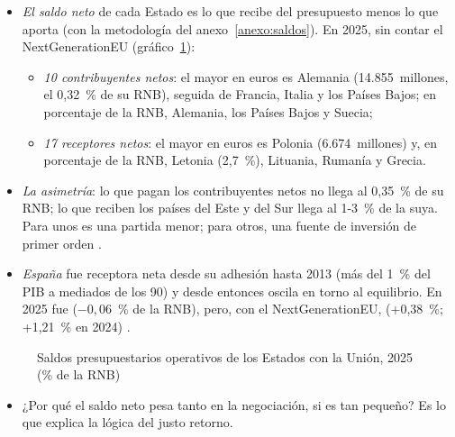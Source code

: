 \documentclass[11pt]{article}
\begin{document}
\begin{itemize}
\item \emph{El saldo neto} de cada Estado es lo que recibe del presupuesto menos lo que aporta (con la metodología del anexo~\ref{anexo:saldos}). En 2025, sin contar el NextGenerationEU (gráfico~\ref{fig:saldos})\nocite{CE2026GastosIngresos}:
  \begin{itemize}
  \item \emph{10 contribuyentes netos}: el mayor en euros es Alemania (14.855~millones, el 0,32~\% de su RNB), seguida de Francia, Italia y los Países Bajos; en porcentaje de la RNB, Alemania, los Países Bajos y Suecia;
  \item \emph{17 receptores netos}: el mayor en euros es Polonia (6.674~millones) y, en porcentaje de la RNB, Letonia (2,7~\%), Lituania, Rumanía y Grecia.
  \end{itemize}
\item \emph{La asimetría}: lo que pagan los contribuyentes netos no llega al 0,35~\% de su RNB; lo que reciben los países del Este y del Sur llega al 1-3~\% de la suya. Para unos es una partida menor; para otros, una fuente de inversión de primer orden .
\item \emph{España} fue receptora neta desde su adhesión hasta 2013 (más del 1~\% del PIB a mediados de los 90) y desde entonces oscila en torno al equilibrio. En 2025 fue  ($-0{,}06$~\% de la RNB), pero, con el NextGenerationEU,  (+0,38~\%; +1,21~\% en 2024)\nocite{Hacienda2026RelacionesFinancieras} .
\end{itemize}

\begin{figure}[H]
\centering
\caption{Saldos presupuestarios operativos de los Estados con la Unión, 2025 (\% de la RNB)}\label{fig:saldos}
\end{figure}

\begin{itemize}
\item ¿Por qué el saldo neto pesa tanto en la negociación, si es tan pequeño? Es lo que explica la lógica del justo retorno.
\end{itemize}
\end{document}
